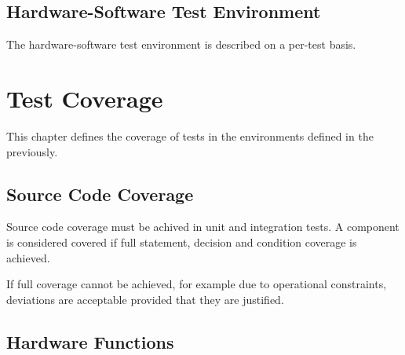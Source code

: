 \section{Hardware-Software Test Environment}

The hardware-software test environment is described on a per-test basis.


\chapter{Test Coverage}

This chapter defines the coverage of tests in the environments defined in the
previously.


\section{Source Code Coverage}

Source code coverage must be achived in unit and integration tests.
A component is considered covered if full statement, decision and condition
coverage is achieved.

If full coverage cannot be achieved, for example due to operational constraints,
deviations are acceptable provided that they are justified.


\section{Hardware Functions}









